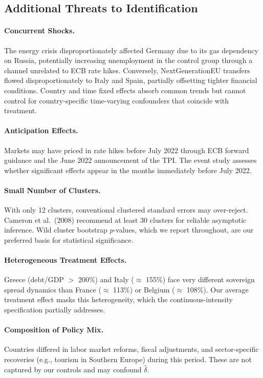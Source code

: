 \documentclass[12pt,a4paper]{article}
\begin{document}
\subsection{Additional Threats to Identification}

\paragraph{Concurrent Shocks.} The energy crisis disproportionately affected Germany due to its gas dependency on Russia, potentially increasing unemployment in the control group through a channel unrelated to ECB rate hikes. Conversely, NextGenerationEU transfers flowed disproportionately to Italy and Spain, partially offsetting tighter financial conditions. Country and time fixed effects absorb common trends but cannot control for country-specific time-varying confounders that coincide with treatment.

\paragraph{Anticipation Effects.} Markets may have priced in rate hikes before July 2022 through ECB forward guidance and the June 2022 announcement of the TPI. The event study assesses whether significant effects appear in the months immediately before July 2022.

\paragraph{Small Number of Clusters.} With only 12 clusters, conventional clustered standard errors may over-reject. Cameron et al.\ (2008) recommend at least 30 clusters for reliable asymptotic inference. Wild cluster bootstrap $p$-values, which we report throughout, are our preferred basis for statistical significance.

\paragraph{Heterogeneous Treatment Effects.} Greece (debt/GDP $>$ 200\%) and Italy ($\approx$ 155\%) face very different sovereign spread dynamics than France ($\approx$ 113\%) or Belgium ($\approx$ 108\%). Our average treatment effect masks this heterogeneity, which the continuous-intensity specification partially addresses.

\paragraph{Composition of Policy Mix.} Countries differed in labor market reforms, fiscal adjustments, and sector-specific recoveries (e.g., tourism in Southern Europe) during this period. These are not captured by our controls and may confound $\hat{\delta}$.
\end{document}
